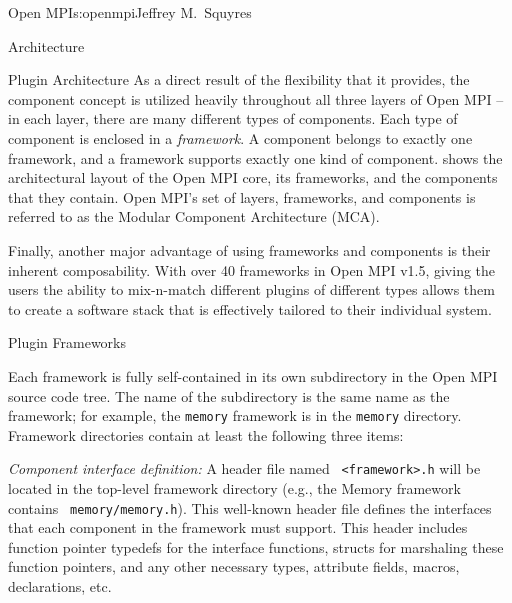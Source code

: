 \begin{aosachapter}{Open MPI}{s:openmpi}{Jeffrey M.\ Squyres}
\begin{aosasect1}{Architecture}
\begin{aosasect2}{Plugin Architecture}
As a direct result of the flexibility that it provides, the component
concept is utilized heavily throughout all three layers of Open MPI --
in each layer, there are many different types of components.
%
Each type of component is enclosed in a {\em framework}.
%
A component belongs to exactly one framework, and a framework supports
exactly one kind of component.
%
 shows the architectural layout of the
Open MPI core, its frameworks, and the components that they contain.
%
Open MPI's set of layers, frameworks, and components is referred to as
the Modular Component Architecture (MCA).


Finally, another major advantage of using frameworks and components is
their inherent composability.  With over 40 frameworks in Open MPI
v1.5, giving the users the ability to mix-n-match different plugins of
different types allows them to create a software stack that is
effectively tailored to their individual system.

\end{aosasect2}


\begin{aosasect2}{Plugin Frameworks}

Each framework is fully self-contained in its own subdirectory in the
Open MPI source code tree.  The name of the subdirectory is the same
name as the framework; for example, the {\tt memory} framework is in
the {\tt memory} directory.  
%
Framework directories contain at least the following three items:

\begin{aosaenumerate}
\item {\em Component interface definition:} A header file named {\tt
    <framework>.h} will be located in the top-level framework
  directory (e.g., the Memory framework contains {\tt
    memory/memory.h}).  This well-known header file defines the
  interfaces that each component in the framework must support.  This
  header includes function pointer typedefs for the interface
  functions, structs for marshaling these function pointers, and any
  other necessary types, attribute fields, macros, declarations, etc.


\end{aosaenumerate}
\end{aosasect2}
\end{aosasect1}
\end{aosachapter}
